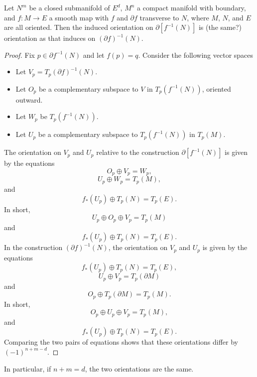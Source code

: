 \begin{lemma}
    Let $N^m$ be a closed submanifold of $E^d$, $M^n$ a compact manifold with boundary, and $f: M \to E$ a smooth map with $f$ and $\partial f$ transverse to $N$, where $M$, $N$, and $E$ are all oriented. Then the induced orientation on $\partial[f^{-1}(N)]$ is (the same?) orientation as that induces on $(\partial f)^{-1}(N)$.
\end{lemma}
\begin{proof}
    Fix $p \in \partial f^{-1}(N)$ and let $f(p) = q$. Consider the following vector spaces
    \begin{itemize}
        \item Let $V_p = T_p (\partial f)^{-1}(N)$.
        \item Let $O_p$ be a complementary subspace to $V$ in $T_p(f^{-1}(N))$, oriented outward.
        \item Let $W_p$ be $T_p(f^{-1}(N))$.
        \item Let $U_p$ be a complementary subspace to $T_p(f^{-1}(N))$ in $T_p(M)$.
    \end{itemize}
    The orientation on $V_p$ and $U_p$ relative to the construction $\partial [f^{-1}(N)]$ is given by the equations
    \[ O_p \oplus V_p = W_p, \]
    \[ U_p \oplus W_p = T_p(M), \]
    and
    \[ f_*(U_p) \oplus T_p(N) = T_p(E). \]
    In short,
    \[ U_p \oplus O_p \oplus V_p = T_p(M) \]
    and
    \[ f_*(U_p) \oplus T_p(N) = T_p(E). \]
    In the construction $(\partial f)^{-1}(N)$, the orientation on $V_p$ and $U_p$ is given by the equations
    \[ f_*(U_p) \oplus T_p(N) = T_p(E), \]
    \[ U_p \oplus V_p = T_p(\partial M) \]
    and
    \[ O_p \oplus T_p(\partial M) = T_p(M). \]
    In short,
    \[ O_p \oplus U_p \oplus V_p = T_p(M), \]
    and
    \[ f_*(U_p) \oplus T_p(N) = T_p(E). \]
    Comparing the two pairs of equations shows that these orientations differ by $(-1)^{n + m - d}$.
\end{proof}

\begin{remark}
    In particular, if $n + m = d$, the two orientations are the same.
\end{remark}

